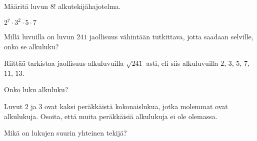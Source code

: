 \begin{tehtavasivu}
\begin{tehtava}

    \begin{vastaus}
    \end{vastaus}
    
\end{tehtava}

\begin{tehtava}
    Määritä luvun $8!$ alkutekijähajotelma.
    
    \begin{vastaus}
        $2^7\cdot 3^2\cdot 5\cdot 7$
    \end{vastaus}
    
\end{tehtava}

\begin{tehtava}
    Millä luvuilla on luvun $241$ jaollisuus vähintään tutkittava, jotta saadaan selville, onko se alkuluku?
    
    \begin{vastaus}
        Riittää tarkistaa jaollisuus alkuluvuilla $\sqrt{241}$ asti, eli siis alkuluvuilla $2$, $3$, $5$, $7$, $11$, $13$.
    \end{vastaus}
\end{tehtava}

\begin{tehtava}
    Onko luku
    alkuluku?

    \begin{vastaus}
    \end{vastaus}
    
\end{tehtava}

\begin{tehtava}
    Luvut $2$ ja $3$ ovat kaksi peräkkäistä kokonaislukua, jotka molemmat ovat alkulukuja. Osoita, että muita peräkkäisiä alkulukuja ei ole olemassa.
\end{tehtava}

\begin{tehtava}
    Mikä on lukujen suurin yhteinen tekijä?
    
    

\end{tehtava}
\end{tehtavasivu}
